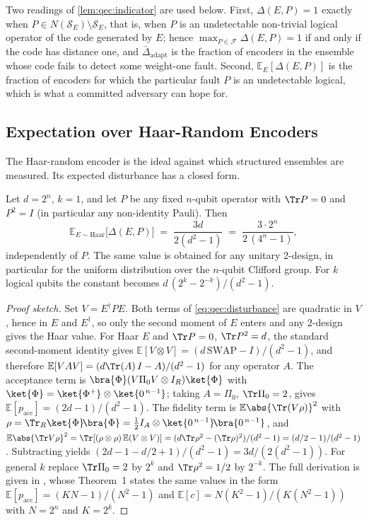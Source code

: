 Two readings of \cref{lem:qec:indicator} are used below. First, $\Delta(E,P)=1$ exactly when $P\in N(\mathcal{S}_E)\setminus\mathcal{S}_E$, that is, when $P$ is an undetectable non-trivial logical operator of the code generated by $E$; hence $\max_{P\in\mathcal{F}}\Delta(E,P)=1$ if and only if the code has distance one, and $\bar\Delta_{\mathrm{adapt}}$ is the fraction of encoders in the ensemble whose code fails to detect some weight-one fault. Second, $\mathbb{E}_E[\Delta(E,P)]$ is the fraction of encoders for which the particular fault $P$ is an undetectable logical, which is what a committed adversary can hope for.

\subsection{Expectation over Haar-Random Encoders}\label{sec:qec:haar}

The Haar-random encoder is the ideal against which structured ensembles are measured. Its expected disturbance has a closed form.

\begin{proposition}\label{prop:qec:haar}
Let $d=2^{n}$, $k=1$, and let $P$ be any fixed $n$-qubit operator with $\Tr P=0$ and $P^{2}=I$ (in particular any non-identity Pauli). Then
\begin{equation}\label{eq:qec:haar}
  \mathbb{E}_{E\sim\mathrm{Haar}}\big[\Delta(E,P)\big]\;=\;\frac{3d}{2(d^{2}-1)}\;=\;\frac{3\cdot 2^{n}}{2\,(4^{n}-1)},
\end{equation}
independently of $P$. The same value is obtained for any unitary 2-design, in particular for the uniform distribution over the $n$-qubit Clifford group. For $k$ logical qubits the constant becomes $d\,(2^{k}-2^{-k})/(d^{2}-1)$.
\end{proposition}
\begin{proof}[Proof sketch]
Set $V=E^{\dagger}PE$. Both terms of \cref{eq:qec:disturbance} are quadratic in $V$, hence in $E$ and $E^{\dagger}$, so only the second moment of $E$ enters and any 2-design gives the Haar value. For Haar $E$ and $\Tr P=0$, $\Tr P^{2}=d$, the standard second-moment identity gives $\mathbb{E}[V\otimes V]=(d\,\mathrm{SWAP}-I)/(d^{2}-1)$, and therefore $\mathbb{E}[VAV]=(d\Tr(A)\,I-A)/(d^{2}-1)$ for any operator $A$. The acceptance term is $\bra{\Phi}(V\Pi_0V\otimes I_R)\ket{\Phi}$ with $\ket{\Phi}=\ket{\Phi^{+}}\otimes\ket{0^{\,n-1}}$; taking $A=\Pi_0$, $\Tr\Pi_0=2$, gives $\mathbb{E}[p_{\mathrm{acc}}]=(2d-1)/(d^{2}-1)$. The fidelity term is $\mathbb{E}\abs{\Tr(V\rho)}^{2}$ with $\rho=\Tr_R\ket{\Phi}\!\bra{\Phi}=\tfrac12 I_A\otimes\ket{0^{\,n-1}}\!\bra{0^{\,n-1}}$, and $\mathbb{E}\abs{\Tr V\rho}^{2}=\Tr[(\rho\otimes\rho)\,\mathbb{E}(V\otimes V)]=(d\Tr\rho^{2}-(\Tr\rho)^{2})/(d^{2}-1)=(d/2-1)/(d^{2}-1)$. Subtracting yields $(2d-1-d/2+1)/(d^{2}-1)=3d/(2(d^{2}-1))$. For general $k$ replace $\Tr\Pi_0=2$ by $2^{k}$ and $\Tr\rho^{2}=1/2$ by $2^{-k}$. The full derivation is given in \cite{guo2026qecaudit}, whose Theorem~1 states the same values in the form $\mathbb{E}[p_{\mathrm{acc}}]=(KN-1)/(N^{2}-1)$ and $\mathbb{E}[c]=N(K^{2}-1)/(K(N^{2}-1))$ with $N=2^{n}$ and $K=2^{k}$.
\end{proof}

